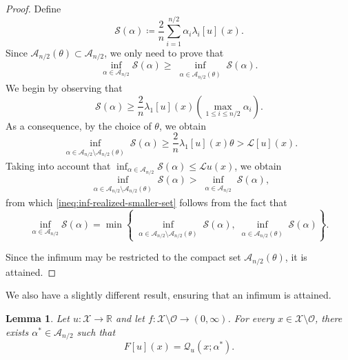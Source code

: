 \documentclass[reqno,11pt]{amsart}
\numberwithin{equation}{section}
\newtheorem{lemma}[theorem]{Lemma}
\theoremstyle{definition}
\theoremstyle{remark}
\begin{document}
\begin{proof}
Define
\[
    \mathcal{S}(\alpha) \coloneqq \frac{2}{n}\sum_{i=1}^{n/2}\alpha_i \lambda_i[u](x).
\]
Since $\mathcal{A}_{n/2}(\theta) \subset \mathcal{A}_{n/2}$, we only need to prove that
\begin{equation}\label{ineq:inf-realized-smaller-set}
    \inf_{\alpha\in\mathcal{A}_{n/2}} \mathcal{S}(\alpha) \geq \inf_{\substack{\alpha\in\mathcal{A}_{n/2}(\theta)}} \mathcal{S}(\alpha).
\end{equation}
We begin by observing that  
\[
   \mathcal{S}(\alpha) \geq \frac{2}{n} \lambda_1[u](x) \left(\max_{1\leq i\leq n/2}\alpha_i\right).
\]
As a consequence, by the choice of $\theta$, we obtain
\[
    \inf_{\substack{\alpha \in \mathcal{A}_{n/2} \setminus \mathcal{A}_{n/2}(\theta)}} \mathcal{S}(\alpha) \geq \frac{2}{n} \lambda_1[u](x) \theta > \mathcal{L}[u](x).
\]
Taking into account that $\inf_{\alpha\in\mathcal{A}_{n/2}} \mathcal{S}(\alpha) \leq \mathcal{L}u(x)$, we obtain
\[
    \inf_{\substack{\alpha \in \mathcal{A}_{n/2} \setminus \mathcal{A}_{n/2}(\theta)}} \mathcal{S}(\alpha) > \inf_{\substack{\alpha \in \mathcal{A}_{n/2}}} \mathcal{S}(\alpha),
\]
from which \eqref{ineq:inf-realized-smaller-set} follows from the fact that
\[
    \inf_{\alpha\in\mathcal{A}_{n/2}}\mathcal{S}(\alpha) = \min\left\{\inf_{\substack{\alpha \in \mathcal{A}_{n/2} \setminus \mathcal{A}_{n/2}(\theta)}}\mathcal{S}(\alpha), \inf_{\substack{\alpha \in \mathcal{A}_{n/2}(\theta)}}\mathcal{S}(\alpha)\right\}.
\]

Since the infimum may be restricted to the compact set \(\mathcal A_{n/2}(\theta)\), it is attained.
\end{proof}

We also have a slightly different result, ensuring that an infimum is attained.

\begin{lemma}\label{lemma:restrict-set-alpha-2}
Let $u\colon \mathcal{X} \to \mathbb{R}$ and let $f\colon \mathcal X\setminus \mathcal O\to (0,\infty)$. For every $x\in\mathcal X\setminus\mathcal O$, there exists $\alpha^*\in\mathcal A_{n/2}$ such that
\[
    F[u](x)=\mathcal Q_u(x;\alpha^*).
\]
\end{lemma}
\end{document}
